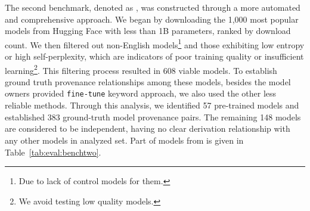The second benchmark, denoted as \bencht, was constructed through a more automated and comprehensive approach. We began by downloading the 1,000 most popular models from Hugging Face with less than 1B parameters, ranked by download count. We then filtered out non-English models\footnote{Due to lack of control models for them.} and those exhibiting low entropy or high self-perplexity, which are indicators of poor training quality or insufficient learning\footnote{We avoid testing low quality models.}. This filtering process resulted in 608 viable models. To establish ground truth provenance relationships among these models, 
besides the model owners provided \texttt{fine-tune} keyword approach, we also used the other less reliable methods. Through this analysis, we identified 57 pre-trained models and established 383 ground-truth model provenance pairs. The remaining 148 models are considered to be independent, having no clear derivation relationship with any other models in analyzed set. Part of models from \bencht is given in Table~\ref{tab:eval:benchtwo}.

